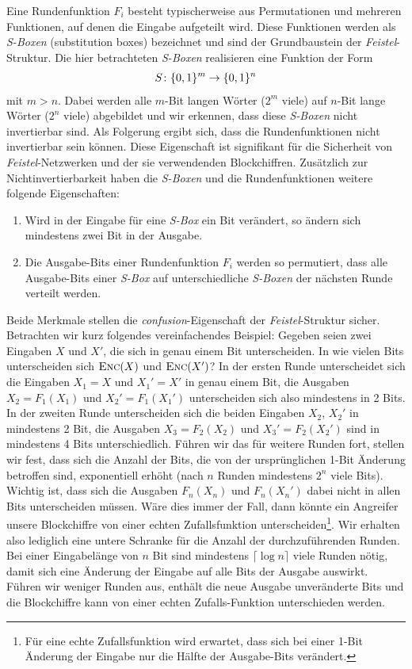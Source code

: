 Eine Rundenfunktion \(F_i\) besteht typischerweise aus Permutationen und mehreren Funktionen, auf denen die Eingabe aufgeteilt wird. Diese Funktionen werden als \textit{S-Boxen} (substitution boxes) bezeichnet und sind der Grundbaustein der \textit{Feistel}-Struktur. Die hier betrachteten \textit{S-Boxen} realisieren eine Funktion der Form
\begin{align*}
	S \colon \{0, 1\}^m \rightarrow \{0, 1\}^n
\end{align*}
mit \(m > n\). Dabei werden alle $m$-Bit langen Wörter (\(2^m\) viele) auf $n$-Bit lange Wörter (\(2^n\) viele) abgebildet und wir erkennen, dass diese \textit{S-Boxen} nicht invertierbar sind. Als Folgerung ergibt sich, dass die Rundenfunktionen nicht invertierbar sein können. Diese Eigenschaft ist signifikant für die Sicherheit von \textit{Feistel}-Netzwerken und der sie verwendenden Blockchiffren. Zusätzlich zur Nichtinvertierbarkeit haben die \textit{S-Boxen} und die Rundenfunktionen weitere folgende Eigenschaften:

\begin{enumerate}
	\item Wird in der Eingabe für eine \textit{S-Box} ein Bit verändert, so ändern sich mindestens zwei Bit in der Ausgabe.
	\item Die Ausgabe-Bits einer Rundenfunktion $F_i$ werden so permutiert, dass alle Ausgabe-Bits einer \textit{S-Box} auf unterschiedliche \textit{S-Boxen} der nächsten Runde verteilt werden.
\end{enumerate}

Beide Merkmale stellen die \textit{confusion}-Eigenschaft der \textit{Feistel}-Struktur sicher. Betrachten wir kurz folgendes vereinfachendes Beispiel:
Gegeben seien zwei Eingaben $X$ und $X'$, die sich in genau einem Bit unterscheiden. In wie vielen Bits unterscheiden sich $\textsc{Enc}(X)$ und $\textsc{Enc}(X')$? 
In der ersten Runde unterscheidet sich die Eingaben $X_1 = X$ und $X_1' = X'$ in genau einem Bit, die Ausgaben $X_2 = F_1(X_1)$ und $X_2' = F_1(X_1')$ unterscheiden sich also mindestens in 2 Bits. In der zweiten Runde unterscheiden sich die beiden Eingaben $X_2$, $X_2'$ in mindestens 2 Bit, die Ausgaben $X_3 = F_2(X_2)$ und $X_3' = F_2(X_2')$ sind in mindestens 4 Bits unterschiedlich. Führen wir das für weitere Runden fort, stellen wir fest, dass sich die Anzahl der Bits, die von der ursprünglichen 1-Bit Änderung betroffen sind, exponentiell erhöht (nach $n$ Runden mindestens $2^n$ viele Bits).
Wichtig ist, dass sich die Ausgaben $F_n(X_n)$ und $F_n(X_n')$ dabei nicht in allen Bits unterscheiden müssen. Wäre dies immer der Fall, dann könnte ein Angreifer unsere Blockchiffre von einer echten Zufallsfunktion unterscheiden\footnote{Für eine echte Zufallsfunktion wird erwartet, dass sich bei einer 1-Bit Änderung der Eingabe nur die Hälfte der Ausgabe-Bits verändert.}. Wir erhalten also lediglich eine untere Schranke für die Anzahl der durchzuführenden Runden. Bei einer Eingabelänge von $n$ Bit sind mindestens $ \lceil \log n \rceil$ viele Runden nötig, damit sich eine Änderung der Eingabe auf alle Bits der Ausgabe auswirkt. Führen wir weniger Runden aus, enthält die neue Ausgabe unveränderte Bits und die Blockchiffre kann von einer echten Zufalls-Funktion unterschieden werden.

